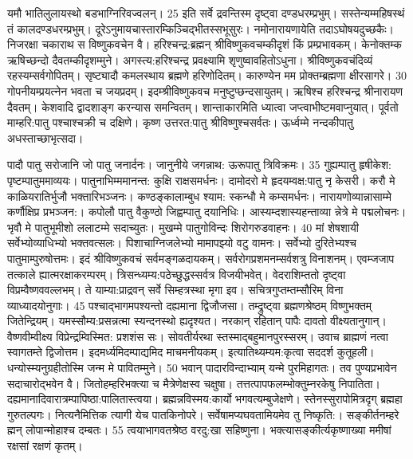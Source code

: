 यमौ भातिलुलायस्थो बडभाग्निरिवज्वलन्।
 25 इति सर्वे द्रवन्तिस्म दृष्ट्वा दण्डधरम्प्रभुम्।
 सस्तेन्यम्महिषस्थं तं कालदण्डधरम्प्रभुम्।
 दूरेऽनुमायचास्तारम्किञ्चिद्भीतस्सभूसुरः।
 नमोनारायणायेति तदाऽघोषयदुच्छकैः।
 निजरक्षा चकाराथ स विष्णुकवचेन वै।
 हरिश्चन्द्र:ब्रह्मन् श्रीविष्णुकवचम्कीदृशं किं प्रम्प्रभावकम्।
 केनोक्तम्क ऋषिच्छन्दो दैवतम्कीदृशम्मुने।
 अगस्त्य:हरिश्चन्द्र प्रवक्ष्यामि शृणुष्वावहितोऽधुना।
 श्रीविष्णुकवचंदिव्यं रहस्यम्सर्वगोपितम्।
 सृष्ट्यादौ कमलस्थाय ब्रह्मणे हरिणोदितम्।
 कारुण्येन मम प्रोक्तम्ब्रह्मणा क्षीरसागरे।
 30 गोपनीयम्प्रयत्नेन भवता च जयप्रदम्।
 इदम्श्रीविष्णुकवच मनुष्टुप्छन्दसायुतम्।
 ऋषिश्च हरिश्चन्द्र श्रीनारायण दैवतम्।
 केशवादि द्वादशाङ्ग करन्यास समन्वितम्।
 शान्ताकारमिति ध्यात्वा जप्त्वाभीष्टमवाप्नुयात्।
 पूर्वतो माम्हरि:पातु पश्चाश्चक्री च दक्षिणे।
 कृष्ण उत्तरत:पातु श्रीविष्णुश्चसर्वतः।
 ऊर्ध्वम्मे नन्दकीपातु अधस्ताच्छाभृत्सदा।
 
पादौ पातु सरोजानि जो पातु जनार्दनः।
 जानुनीये जगन्नाथ: ऊरूपातु त्रिविक्रमः।
 35 गुह्यम्पातु हृषीकेश: पृष्टम्पातुममाव्ययः।
 पातुनाभिम्ममानन्त: कुक्षि राक्षसमर्धनः।
 दामोदरो मे हृदयम्वक्ष:पातु नृ केसरी।
 करौ मे काळियरातिर्भुजौ भक्तारिभञ्जनः।
 कण्ठङ्कालाम्बुध श्याम: स्कन्धौ मे कम्समर्धनः।
 नारायणोव्यान्नासाम्मे कर्णौक्षिप्र प्रभञ्जन:।
 कपोलौ पातु वैकुण्ठो जिह्वम्पातु दयानिधिः।
 आस्यम्दशास्यहन्ताव्या न्नेत्रे मे पद्मलोचनः।
 भृवौ मे पातुभूमीशो ललाटम्मे सदाच्युतः।
 मुखम्मे पातुगोविन्दः शिरोगरुडवाहनः।
 40 मां शेषशायी सर्वेभ्योव्याधिभ्यो भक्तवत्सलः।
 पिशाचाग्निजलेभ्यो मामापझ्यो वटु वामनः।
 सर्वेभ्यो दुरितेभ्यश्च पातुमाम्पुरुषोत्तमः।
 इदं श्रीविष्णुकवचं सर्वमङ्गळदायकम्।
 सर्वरोगप्रशमनम्सर्वशत्रु विनाशनम्।
 एवम्जजाप तत्काले ह्यात्मरक्षाकरम्परम्।
 त्रिसन्ध्यम्य:पठेच्छुद्धस्सर्वत्र विजयीभवेत्।
 वेदराशिम्ततो दृष्ट्वा विप्रम्वैष्णववल्लभम्।
 ते याम्या:प्राद्रवन् सर्वे सिम्हत्रस्था मृगा इव।
 सचित्रगुप्तम्तम्सौरिम् विना व्याध्यादयोनुगाः।
 45
पश्चाद्भागमपश्यन्तो दह्यमाना द्विजौजसा।
 तम्द्रुष्ट्वा ब्रह्मणश्रेष्ठम् विष्णुभक्तम् जितेन्द्रियम्।
 यमस्सौम्य:प्रसन्नत्मा स्यन्दनस्थो ह्यदृश्यत।
 नरकान् रहितान् पापैः दावतो वीक्ष्यतानुगान्।
 वैष्णवीम्वीक्ष्य विप्रेन्द्रम्विस्मित: प्रशशंस सः।
 सोवतीर्यरथा स्तस्माद्बहुमानपुरस्सरम्।
 उवाच ब्राह्मणं नत्वा स्वागतम्ते द्विजोत्तम।
 इदमर्ध्यमिदम्पाद्यमिद माचमनीयकम्।
 इत्यातिथ्यम्यम:कृत्वा सददर्श कुतूहली।
 धन्योस्म्यनुग्रहीतोस्मि जन्म मे पावितम्मुने।
 50 भवान् पादारविन्दाभ्याम् यन्मे पुरमिहागतः।
 तव पुण्यप्रभावेन सदाचारोद्भवेन वै।
 जितोहम्हरिभक्त्या च मैत्रेणेक्षस्व चक्षुषा।
 तत्तत्पापफलम्भोक्तुम्नरकेषु निपातिता।
 दह्यमानादिवारात्रम्पापिष्ठा:पालितास्त्वया।
 ब्रह्मन्नविस्मय:कार्यो भगवत्यम्बुजेक्षणे।
 स्तेनस्सुरापोमित्रदृग् ब्रह्महा गुरुतल्पगः।
 नित्यनैमित्तिक त्यागी येच पातकिनोपरे।
 सर्वेषामप्यघवतामियमेव तु निष्कृति:।
 सङ्कीर्तनम्हरे ह्मन् लोपान्मोहाश्च दम्बतः।
 55 त्वयाभागवतश्रेष्ठ वरदु:खा सहिष्णुना।
 भक्त्यासङ्कीर्त्यकृष्णाख्या ममीषां रक्षसां रक्षणं कृतम्।
 

